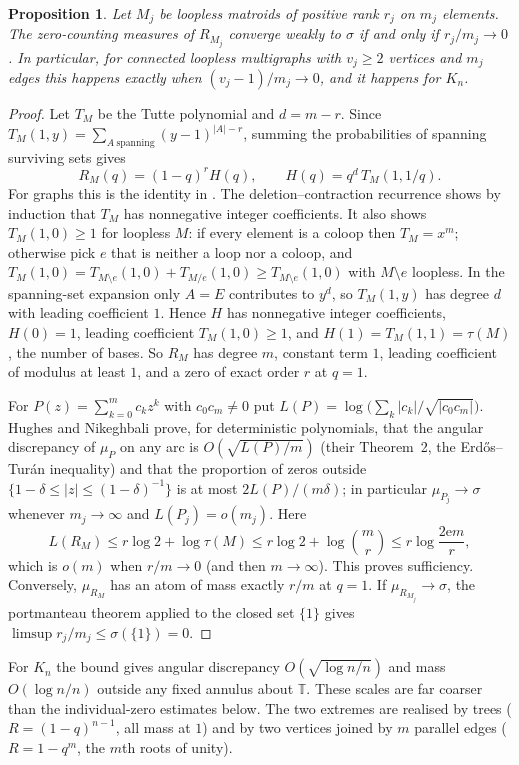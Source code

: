 \documentclass[11pt,a4paper]{article}
\newtheorem{proposition}[theorem]{Proposition}
\theoremstyle{remark}
\newcommand{\T}{\mathbb T}
\newcommand{\e}{\mathrm e}
\begin{document}
\begin{proposition}\label{prop:global}
Let $M_j$ be loopless matroids of positive rank $r_j$ on $m_j$ elements. The zero-counting measures of $R_{M_j}$ converge weakly to $\sigma$ if and only if $r_j/m_j\to0$. In particular, for connected loopless multigraphs with $v_j\ge2$ vertices and $m_j$ edges this happens exactly when $(v_j-1)/m_j\to0$, and it happens for $K_n$.
\end{proposition}

\begin{proof}
Let $T_M$ be the Tutte polynomial and $d=m-r$. Since $T_M(1,y)=\sum_{A\ \text{spanning}}(y-1)^{|A|-r}$, summing the probabilities of spanning surviving sets gives
\[
R_M(q)=(1-q)^rH(q),\qquad H(q)=q^{d}\,T_M(1,1/q).
\]
For graphs this is the identity in \cite[\S4.7]{BH}. The deletion--contraction recurrence shows by induction that $T_M$ has nonnegative integer coefficients. It also shows $T_M(1,0)\ge1$ for loopless $M$: if every element is a coloop then $T_M=x^m$; otherwise pick $e$ that is neither a loop nor a coloop, and $T_M(1,0)=T_{M\setminus e}(1,0)+T_{M/e}(1,0)\ge T_{M\setminus e}(1,0)$ with $M\setminus e$ loopless. In the spanning-set expansion only $A=E$ contributes to $y^d$, so $T_M(1,y)$ has degree $d$ with leading coefficient $1$. Hence $H$ has nonnegative integer coefficients, $H(0)=1$, leading coefficient $T_M(1,0)\ge1$, and $H(1)=T_M(1,1)=\tau(M)$, the number of bases. So $R_M$ has degree $m$, constant term $1$, leading coefficient of modulus at least $1$, and a zero of exact order $r$ at $q=1$.

For $P(z)=\sum_{k=0}^mc_kz^k$ with $c_0c_m\ne0$ put $L(P)=\log\bigl(\sum_k|c_k|/\sqrt{|c_0c_m|}\bigr)$. Hughes and Nikeghbali \cite[Theorems~1--3]{HN} prove, for deterministic polynomials, that the angular discrepancy of $\mu_P$ on any arc is $O(\sqrt{L(P)/m})$ (their Theorem~2, the Erd\H os--Tur\'an inequality) and that the proportion of zeros outside $\{1-\delta\le|z|\le(1-\delta)^{-1}\}$ is at most $2L(P)/(m\delta)$; in particular $\mu_{P_j}\to\sigma$ whenever $m_j\to\infty$ and $L(P_j)=o(m_j)$. Here
\[
L(R_M)\le r\log2+\log\tau(M)\le r\log2+\log\binom mr\le r\log\frac{2\e m}{r},
\]
which is $o(m)$ when $r/m\to0$ (and then $m\to\infty$). This proves sufficiency. Conversely, $\mu_{R_M}$ has an atom of mass exactly $r/m$ at $q=1$. If $\mu_{R_{M_j}}\to\sigma$, the portmanteau theorem applied to the closed set $\{1\}$ gives $\limsup r_j/m_j\le\sigma(\{1\})=0$.
\end{proof}

For $K_n$ the bound gives angular discrepancy $O(\sqrt{\log n/n})$ and mass $O(\log n/n)$ outside any fixed annulus about $\T$. These scales are far coarser than the individual-zero estimates below. The two extremes are realised by trees ($R=(1-q)^{n-1}$, all mass at $1$) and by two vertices joined by $m$ parallel edges ($R=1-q^m$, the $m$th roots of unity).
\end{document}
